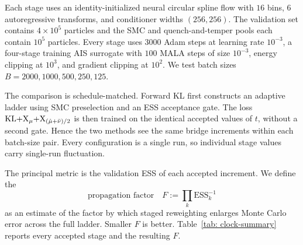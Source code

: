 \documentclass{article}
\begin{document}
Each stage uses an identity-initialized neural circular spline flow with $16$ bins, $6$ autoregressive transforms, and conditioner widths $(256,256)$. The validation set contains $4\times10^5$ particles and the SMC and quench-and-temper pools each contain $10^5$ particles. Every stage uses $3000$ Adam steps at learning rate $10^{-3}$, a four-stage training AIS surrogate with $100$ MALA steps of size $10^{-3}$, energy clipping at $10^3$, and gradient clipping at $10^2$. We test batch sizes $B=2000,1000,500,250,125$.

The comparison is schedule-matched. Forward KL first constructs an adaptive ladder using SMC preselection and an ESS acceptance gate. The loss $\mathrm{KL}{+}\mathrm{X}_\mu{+}\mathrm{X}_{(\hat\mu+\bar\nu)/2}$ is then trained on the identical accepted values of $t$, without a second gate. Hence the two methods see the same bridge increments within each batch-size pair. Every configuration is a single run, so individual stage values carry single-run fluctuation.

The principal metric is the validation ESS of each accepted increment. We define the
\[
\text{propagation factor}\quad F:=\prod_k \mathrm{ESS}_k^{-1}
\]
as an estimate of the factor by which staged reweighting enlarges Monte Carlo error across the full ladder. Smaller $F$ is better. Table~\ref{tab: clock-summary} reports every accepted stage and the resulting $F$.
\end{document}
